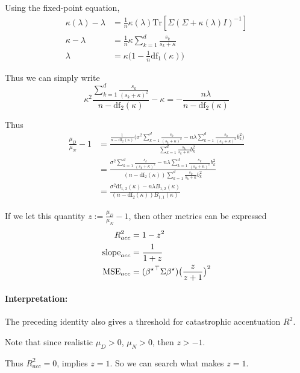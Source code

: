 Using the fixed-point equation,
\begin{align*}
\kappa(\lambda)-\lambda & =\frac{1}{n}\kappa(\lambda)\mathrm{Tr}[\Sigma(\Sigma+\kappa(\lambda)I)^{-1}]\\
\kappa-\lambda & =\frac{1}{n}\kappa\sum_{k=1}^{d}\frac{s_{k}}{s_{k}+\kappa}\\
\lambda & =\kappa\big(1-\frac{1}{n}\mathrm{df}_{1}(\kappa)\big)
\end{align*}

Thus we can simply write
\[
\kappa^{2}\frac{\sum_{k=1}^{d}\frac{s_{k}}{(s_{k}+\kappa)^{2}}}{n-\mathrm{df}_{2}(\kappa)}-\kappa=-\frac{n\lambda}{n-\mathrm{df}_{2}(\kappa)}
\]

Thus
\begin{align}
\frac{\mu_{D}}{\mu_{N}}-1 & =\frac{\frac{1}{n-\mathrm{df}_{2}(\kappa)}\Big(\sigma^{2}\sum_{k=1}^{d}\frac{s_{k}}{(s_{k}+\kappa)^{2}}-n\lambda\sum_{k=1}^{d}\frac{s_{k}}{(s_{k}+\kappa)^{2}}b_{k}^{2}\Big)}{\sum_{k=1}^{d}\frac{s_{k}}{s_{k}+\kappa}b_{k}^{2}}\label{eq:z_simplify_identity}\\
 & =\frac{\sigma^{2}\sum_{k=1}^{d}\frac{s_{k}}{(s_{k}+\kappa)^{2}}-n\lambda\sum_{k=1}^{d}\frac{s_{k}}{(s_{k}+\kappa)^{2}}b_{k}^{2}}{(n-\mathrm{df}_{2}(\kappa))\sum_{k=1}^{d}\frac{s_{k}}{s_{k}+\kappa}b_{k}^{2}}\\
 & =\frac{\sigma^{2}\mathrm{df}_{1,2}(\kappa)-n\lambda B_{1,2}(\kappa)}{(n-\mathrm{df}_{2}(\kappa))B_{1,1}(\kappa)}
\end{align}

If we let this quantity $z:=\frac{\mu_{D}}{\mu_{N}}-1$, then other
metrics can be expressed
\begin{align*}
R_{acc}^{2} & =1-z^{2}\\
\mathrm{slope}_{acc} & =\frac{1}{1+z}\\
\mathrm{MSE}_{acc} & =({{\beta^{\star}}}^{\top}\Sigma{\beta^{\star}})\big(\frac{z}{z+1}\big)^{2}
\end{align*}


\paragraph{Interpretation:}

The preceding identity also gives a threshold for catastrophic accentuation
$R^2$.

Note that since realistic $\mu_{D}>0$, $\mu_{N}>0$, then $z>-1$.

Thus $R_{acc}^{2}=0$, implies $z=1$. So we can search what makes
$z=1$.

